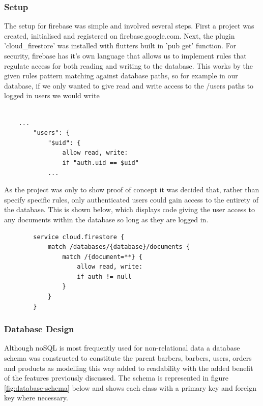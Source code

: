 \documentclass[12pt]{article}
\begin{document}
	\subsubsection{Setup}
	The setup for firebase was simple and involved several steps. First a project was created, initialised and registered on firebase.google.com. Next, the plugin 'cloud\_firestore' was installed with flutters built in 'pub get' function. For security, firebase has it's own language that allows us to implement rules that regulate access for both reading and writing to the database. This works by the given rules pattern matching against database paths, so for example in our database, if we only wanted to give read and write access to the /users paths to logged in users we would write 
	\begin{verbatim}

	...
		"users": {
			"$uid": {
				allow read, write:
				if "auth.uid == $uid"
			...
	\end{verbatim}

	As the project was only to show proof of concept it was decided that, rather than specify specific rules, only authenticated users could gain access to the entirety of the database. This is shown below, which displays code giving the user access to any documents within the database so long as they are logged in.
	
	\begin{verbatim}
		service cloud.firestore {
			match /databases/{database}/documents {
				match /{document=**} {
					allow read, write:
					if auth != null
				}
			}
		}
	\end{verbatim}
	
	
	\subsubsection{Database Design}
	Although noSQL is most frequently used for non-relational data a database schema was constructed to constitute the parent barbers, barbers, users, orders  and products as modelling this way added to readability with the added benefit of the features previously discussed. The schema is represented in figure \ref{fig:database-schema} below and shows each class with a primary key and foreign key where necessary.
\end{document}
